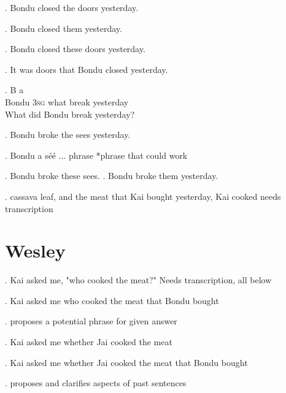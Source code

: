 \documentclass{assets/fieldnotes}
\begin{document}

\ex. Bondu closed the doors yesterday.

\ex. Bondu closed them yesterday.

\ex. Bondu closed these doors yesterday.

\ex. It was doors that Bondu closed yesterday. 

\exg. B a   \\
Bondu \textsc{\textsc{3sg}} what break yesterday\\
What did Bondu break yesterday?


\ex. Bondu broke the sees yesterday.

\exg. Bondu a séé ... phrase *phrase that could work

\ex. Bondu broke these sees.
\ex. Bondu broke them yesterday.


\ex. cassava leaf, and the meat that Kai bought yesterday, Kai cooked 
{needs transcription}

\section{Wesley}


\ex. Kai asked me, "who cooked the meat?"
{ Needs transcription, all below}

\ex. Kai asked me who cooked the meat that Bondu bought

\exg. proposes a potential phrase for given answer 

\ex. Kai asked me whether Jai cooked the meat 

\ex. Kai asked me whether Jai cooked the meat that Bondu bought

\exg. proposes and clarifies aspects of past sentences
\end{document}
